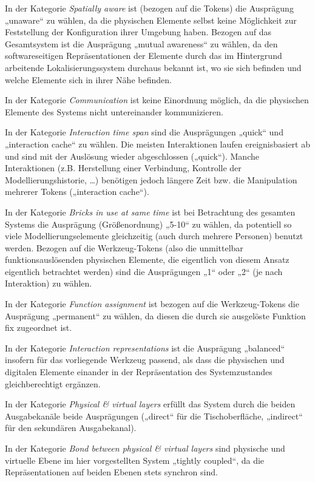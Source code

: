 In der Kategorie \emph{Spatially aware} ist (bezogen auf die Tokens) die Ausprägung „unaware“ zu wählen, da die physischen Elemente selbst keine Möglichkeit zur Feststellung der Konfiguration ihrer Umgebung haben. Bezogen auf das Gesamtsystem ist die Ausprägung „mutual awareness“ zu wählen, da den softwareseitigen Repräsentationen der Elemente durch das im Hintergrund arbeitende Lokalisierungssystem durchaus bekannt ist, wo sie sich befinden und welche Elemente sich in ihrer Nähe befinden.

In der Kategorie \emph{Communication} ist keine Einordnung möglich, da die physischen Elemente des Systems nicht untereinander kommunizieren.

In der Kategorie \emph{Interaction time span} sind die Ausprägungen „quick“ und „interaction cache“ zu wählen. Die meisten Interaktionen laufen ereignisbasiert ab und sind mit der Auslösung wieder abgeschlossen („quick“). Manche Interaktionen (z.B. Herstellung einer Verbindung, Kontrolle der Modellierungshistorie, \ldots) benötigen jedoch längere Zeit bzw. die Manipulation mehrerer Tokens („interaction cache“).

In der Kategorie \emph{Bricks in use at same time} ist bei Betrachtung des gesamten Systems die Ausprägung (Größenordnung) „5-10“ zu wählen, da potentiell so viele Modellierungselemente gleichzeitig (auch durch mehrere Personen) benutzt werden. Bezogen auf die Werkzeug-Tokens (also die unmittelbar funktionsauslösenden physischen Elemente, die eigentlich von diesem Ansatz eigentlich betrachtet werden) sind die Ausprägungen „1“ oder „2“ (je nach Interaktion) zu wählen.  

In der Kategorie \emph{Function assignment} ist bezogen auf die Werkzeug-Tokens die Ausprägung „permanent“ zu wählen, da diesen die durch sie ausgelöste Funktion fix zugeordnet ist.

In der Kategorie \emph{Interaction representations} ist die Ausprägung „balanced“ insofern für das vorliegende Werkzeug passend, als dass die physischen und digitalen Elemente einander in der Repräsentation des Systemzustandes gleichberechtigt ergänzen.

In der Kategorie \emph{Physical \& virtual layers} erfüllt das System durch die beiden Ausgabekanäle beide Ausprägungen („direct“ für die Tischoberfläche, „indirect“ für den sekundären Ausgabekanal).

In der Kategorie \emph{Bond between physical \& virtual layers} sind physische und virtuelle Ebene im hier vorgestellten System „tightly coupled“, da die Repräsentationen auf beiden Ebenen stets synchron sind.

